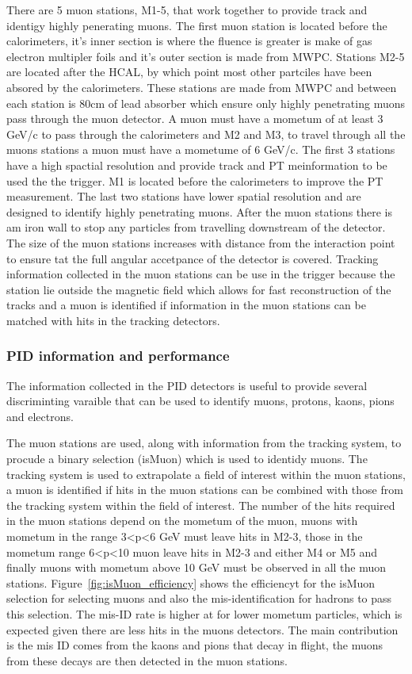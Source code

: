 There are 5 muon stations, M1-5, that work together to provide track and identigy highly penerating muons. The first muon station is located before the calorimeters, it's inner section is where the fluence is greater is make of gas electron multipler foils and it's outer section is made from MWPC. Stations M2-5 are located after the HCAL, by which point most other partciles have been absored by the calorimeters. These stations are made from MWPC and between each station is 80cm of lead absorber which ensure only highly penetrating muons pass through the muon detector. A muon must have a mometum of at least 3 GeV/c to pass through the calorimeters and M2 and M3, to travel through all the muons stations a muon must have a mometume of 6 GeV/c. 
The first 3 stations have a high spactial resolution and provide track and PT meinformation to be used the the trigger. M1 is located before the calorimeters to improve the PT measurement. The last two stations have lower spatial resolution and are designed to identify highly penetrating muons. After the muon stations there is am iron wall to stop any particles from travelling downstream of the detector. The size of the muon stations increases with distance from the interaction point to ensure tat the full angular accetpance of the detector is covered. Tracking information collected in the muon stations can be use in the trigger because the station lie outside the magnetic field which allows for fast reconstruction of the tracks and a muon is identified if information in the muon stations can be matched with hits in the tracking detectors. 

\subsubsection{PID information and performance}
\label{PID_variables}

The information collected in the PID detectors is useful to provide several discriminting varaible that can be used to identify muons, protons, kaons, pions and electrons.

The muon stations are used, along with information from the tracking system, to procude a binary selection (isMuon) which is used to identidy muons. The tracking system is used to extrapolate a field of interest within the muon stations, a muon is identified if hits in the muon stations can be combined with those from the tracking system within the field of interest. The number of the hits required in the muon stations depend on the mometum of the muon, muons with mometum in the range 3<p<6 GeV must leave hits in M2-3, those in the  mometum range 6<p<10 muon leave hits in M2-3 and either M4 or M5 and finally muons with mometum above 10 GeV must be observed in all the muon stations. Figure~\ref{fig:isMuon_efficiency} shows the efficiencyt for the isMuon selection for selecting muons and also the mis-identification for hadrons to pass this selection. The mis-ID rate is higher at for lower mometum particles, which is expected given there are less hits in the muons detectors. The main contribution is the mis ID comes from the kaons and pions that decay in flight, the  muons from these decays are then detected in the muon stations.





